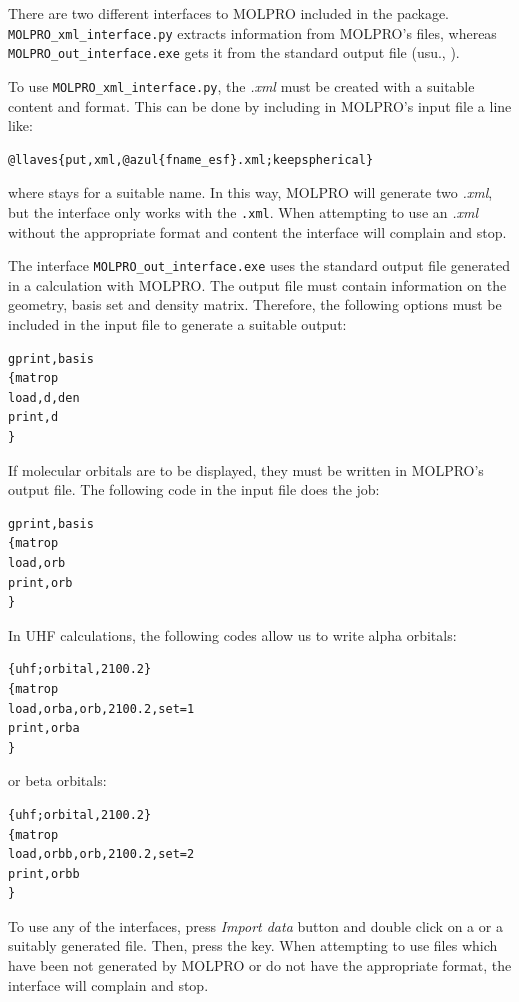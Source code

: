 \documentclass[10pt]{article}
\begin{document}
There are two different interfaces to MOLPRO included in the package. 
\texttt{MOLPRO\_xml\_interface.py} extracts information from MOLPRO's \xml{ } files, 
whereas \texttt{MOLPRO\_out\_interface.exe} gets it from the standard 
output file (usu., \out). 

To use \texttt{MOLPRO\_xml\_interface.py}, the {\it .xml} must be created
with a suitable content and format. This can be done by including in MOLPRO's input 
file a line like:

\begin{Verbatim}[frame=none,commandchars=\@\{\}]
@llaves{put,xml,@azul{fname_esf}.xml;keepspherical}
\end{Verbatim}

where  stays for a suitable name. In this way, MOLPRO will 
generate two 
{\it .xml}, but the interface only works with the \texttt{.xml}. When 
attempting to use an {\it .xml} without the appropriate format and content the 
interface will complain and stop.

The interface \texttt{MOLPRO\_out\_interface.exe} uses the standard output file 
generated in a calculation with MOLPRO. The output file must contain information on the
geometry, basis set and density matrix. Therefore, the following options must
be included in the input file to generate a suitable output:
\begin{verbatim}
gprint,basis
{matrop
load,d,den 
print,d
} 
\end{verbatim}

If molecular orbitals are to be displayed, they must be written in MOLPRO's
output file. The following code in the input file does the job:
\begin{verbatim}
gprint,basis
{matrop
load,orb 
print,orb
} 
\end{verbatim}

In UHF calculations, the following codes allow us to write alpha orbitals:

\begin{verbatim}
{uhf;orbital,2100.2}
{matrop
load,orba,orb,2100.2,set=1
print,orba
}
\end{verbatim}

or beta orbitals:

\begin{verbatim}
{uhf;orbital,2100.2}
{matrop
load,orbb,orb,2100.2,set=2
print,orbb
} 
\end{verbatim}

To use any of the interfaces, press {\it Import data} button \teclapuntos and double 
click on a \out{ } or a suitably generated \xml{ } file. Then, press the \exec key. 
When attempting to use files which have been not generated by MOLPRO or do not have 
the appropriate format, the interface will complain and stop.
\end{document}
